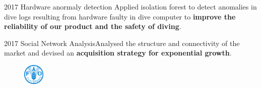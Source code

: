 \documentclass{tccv}
\begin{document}
\begin{yearlist}

  \item{2017} {Hardware anormaly detection} {Applied isolation forest to detect
    anomalies in dive logs resulting from hardware faulty in dive
    computer to \textbf{improve the reliability of our product and the
      safety of diving}.}

  \item{2017} {Social Network Analysis}{Analysed the structure and
    connectivity of the market and devised an \textbf{acquisition
      strategy for exponential growth}.}
    
\end{yearlist}


\begin{figure}[h!] %
  \centering
  \includegraphics[width=1cm,height=1cm]{../company_icon/fao.png}
\end{figure}
\end{document}
